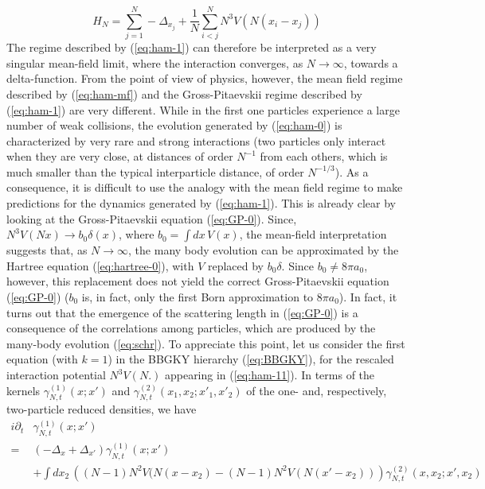 \documentclass[11pt,a4paper,DIV11]{scrartcl}	%
\begin{document}
\begin{equation}\label{eq:ham-11} H_N = \sum_{j=1}^N -\Delta_{x_j} + \frac{1}{N} \sum_{i<j}^N N^3 V (N (x_i - x_j)) \end{equation}
The regime described by (\ref{eq:ham-1}) can therefore be interpreted as a very singular mean-field limit, where the interaction converges, as $N \to \infty$, towards a delta-function. 
{F}rom the point of view of physics, however, the mean field regime described by (\ref{eq:ham-mf}) and the Gross-Pitaevskii regime described by (\ref{eq:ham-1}) are very different. While in the first one particles experience a large number of weak collisions, the evolution generated by (\ref{eq:ham-0}) is characterized by very rare and strong interactions (two particles only interact when they are very close, at distances of order $N^{-1}$ from each others, which is much smaller than the typical interparticle distance, of order $N^{-1/3}$). As a consequence, it is difficult to use the analogy with the mean field regime to make predictions for the dynamics generated by (\ref{eq:ham-1}). This is already clear by looking at the Gross-Pitaevskii equation (\ref{eq:GP-0}). Since, $N^3 V(Nx) \to b_0 \delta (x)$, where $b_0 = \int dx\, V(x)$, the mean-field interpretation suggests that, as $N \to \infty$, the many body evolution can be approximated by the Hartree equation (\ref{eq:hartree-0}), with $V$ replaced by $b_0 \delta$. Since $b_0 \not = 8 \pi a_0$, however, this replacement does not yield the correct Gross-Pitaevskii equation (\ref{eq:GP-0}) ($b_0$ is, in fact, only the first Born approximation to $8\pi a_0$). In fact, it turns out that the emergence of the scattering length in (\ref{eq:GP-0}) is a consequence of the correlations among particles, which are produced by the many-body evolution  (\ref{eq:schr}). To appreciate this point, let us consider the first equation (with $k=1$) in the BBGKY hierarchy (\ref{eq:BBGKY}), for the rescaled interaction potential $N^3 V (N.)$ appearing in (\ref{eq:ham-11}). In terms of the kernels $\gamma^{(1)}_{N,t} (x;x')$ and $\gamma^{(2)}_{N,t} (x_1, x_2 ; x'_1, x'_2)$ of the one- and, respectively, two-particle reduced densities, we have
\begin{equation}\label{eq:BBGKY1} \begin{split} 
i\partial_t & \gamma^{(1)}_{N,t} (x;x') \\ = \; & \left( -\Delta_x + \Delta_{x'} \right) \gamma^{(1)}_{N,t} (x;x')  
\\ &+ \int dx_2 \, \left( (N-1) N^2 V (N (x-x_2) - (N-1) N^2 V(N (x'-x_2)) \right) \gamma^{(2)}_{N,t} (x,x_2 ; x',x_2) \end{split} \end{equation}
\end{document}
